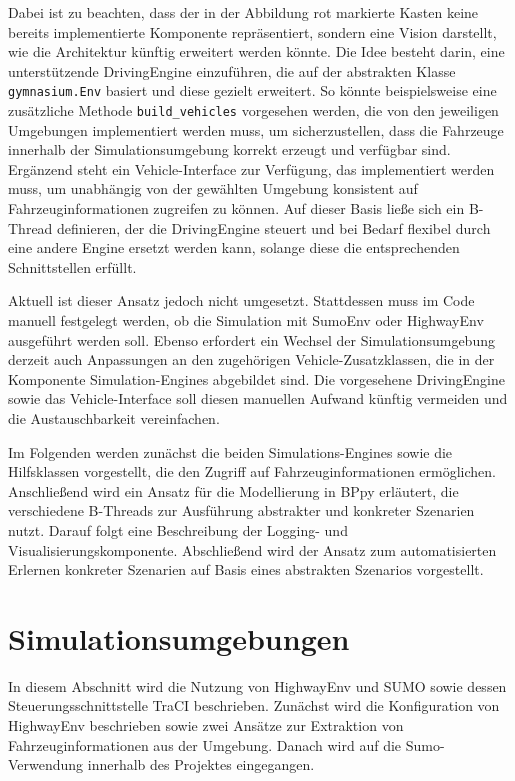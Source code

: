 Dabei ist zu beachten, dass der in der Abbildung rot markierte Kasten keine bereits implementierte Komponente repräsentiert, sondern eine Vision darstellt, wie die Architektur künftig erweitert werden könnte. Die Idee besteht darin, eine unterstützende DrivingEngine einzuführen, die auf der abstrakten Klasse \texttt{gymnasium.Env} basiert und diese gezielt erweitert. So könnte beispielsweise eine zusätzliche Methode \texttt{build\_vehicles} vorgesehen werden, die von den jeweiligen Umgebungen implementiert werden muss, um sicherzustellen, dass die Fahrzeuge innerhalb der Simulationsumgebung korrekt erzeugt und verfügbar sind. Ergänzend steht ein Vehicle-Interface zur Verfügung, das implementiert werden muss, um unabhängig von der gewählten Umgebung konsistent auf Fahrzeuginformationen zugreifen zu können. Auf dieser Basis ließe sich ein B-Thread definieren, der die DrivingEngine steuert und bei Bedarf flexibel durch eine andere Engine ersetzt werden kann, solange diese die entsprechenden Schnittstellen erfüllt.

Aktuell ist dieser Ansatz jedoch nicht umgesetzt. Stattdessen muss im Code manuell festgelegt werden, ob die Simulation mit SumoEnv oder HighwayEnv ausgeführt werden soll. Ebenso erfordert ein Wechsel der Simulationsumgebung derzeit auch Anpassungen an den zugehörigen Vehicle-Zusatzklassen, die in der Komponente Simulation-Engines abgebildet sind. Die vorgesehene DrivingEngine sowie das Vehicle-Interface soll diesen manuellen Aufwand künftig vermeiden und die Austauschbarkeit vereinfachen.

Im Folgenden werden zunächst die beiden Simulations-Engines sowie die Hilfsklassen vorgestellt, die den Zugriff auf Fahrzeuginformationen ermöglichen. Anschließend wird ein Ansatz für die Modellierung in BPpy erläutert, die verschiedene B-Threads zur Ausführung abstrakter und konkreter Szenarien nutzt. Darauf folgt eine Beschreibung der Logging- und Visualisierungskomponente. Abschließend wird der Ansatz zum automatisierten Erlernen konkreter Szenarien auf Basis eines abstrakten Szenarios vorgestellt.

\section{Simulationsumgebungen}
In diesem Abschnitt wird die Nutzung von HighwayEnv und SUMO sowie dessen Steuerungsschnittstelle TraCI beschrieben. Zunächst wird die Konfiguration von HighwayEnv beschrieben sowie zwei Ansätze zur Extraktion von Fahrzeuginformationen aus der Umgebung. Danach wird auf die Sumo-Verwendung innerhalb des Projektes eingegangen.
